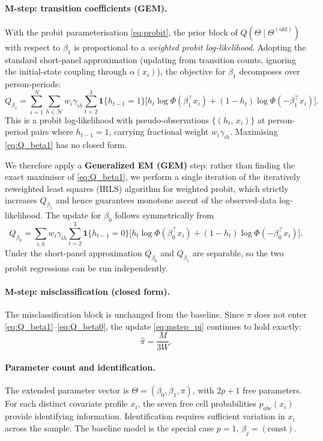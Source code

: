 \paragraph{M-step: transition coefficients (GEM).}
With the probit parameterisation \eqref{eq:probit}, the prior block of
\(Q(\Theta \mid \Theta^{(\text{old})})\) with respect to \(\beta_1\) is
proportional to a \emph{weighted probit log-likelihood}. Adopting the
standard short-panel approximation (updating from transition counts,
ignoring the initial-state coupling through \(\alpha(x_i)\)), the
objective for \(\beta_1\) decomposes over person-periods:
\begin{equation}
Q_{\beta_1} = \sum_{i=1}^{N} \sum_{h \in \mathcal{H}} w_i \gamma_{ih}
  \sum_{t=2}^{3} \mathbf{1}\{h_{t-1} = 1\}
  \Big[
    h_t \log \Phi(\beta_1^\top x_i)
    + (1 - h_t) \log \Phi(-\beta_1^\top x_i)
  \Big].
\label{eq:Q_beta1}
\end{equation}
This is a probit log-likelihood with pseudo-observations
\(\{(h_t,\, x_i)\}\) at person-period pairs where \(h_{t-1} = 1\),
carrying fractional weight \(w_i \gamma_{ih}\). Maximising
\eqref{eq:Q_beta1} has no closed form.

We therefore apply a \textbf{Generalized EM (GEM)} step: rather than
finding the exact maximiser of \eqref{eq:Q_beta1}, we perform a single
iteration of the iteratively reweighted least squares (IRLS) algorithm
for weighted probit, which strictly increases \(Q_{\beta_1}\) and
hence guarantees monotone ascent of the observed-data log-likelihood.
The update for \(\beta_0\) follows symmetrically from
\begin{equation}
Q_{\beta_0} = \sum_{i,h} w_i \gamma_{ih}
  \sum_{t=2}^{3} \mathbf{1}\{h_{t-1} = 0\}
  \Big[
    h_t \log \Phi(\beta_0^\top x_i)
    + (1 - h_t) \log \Phi(-\beta_0^\top x_i)
  \Big].
\label{eq:Q_beta0}
\end{equation}
Under the short-panel approximation \(Q_{\beta_0}\) and \(Q_{\beta_1}\)
are separable, so the two probit regressions can be run independently.

\paragraph{M-step: misclassification (closed form).}
The misclassification block is unchanged from the baseline. Since
\(\pi\) does not enter \eqref{eq:Q_beta1}--\eqref{eq:Q_beta0}, the
update \eqref{eq:mstep_pi} continues to hold exactly:
\[
\hat{\pi} = \frac{M}{3W}.
\]

\paragraph{Parameter count and identification.}
The extended parameter vector is \(\Theta = (\beta_0, \beta_1, \pi)\),
with \(2p + 1\) free parameters. For each distinct covariate profile
\(x_i\), the seven free cell probabilities \(p_{abc}(x_i)\) provide
identifying information. Identification requires sufficient variation in
\(x_i\) across the sample. The baseline model is the special case
\(p = 1\), \(\beta_j = (\text{const})\).


